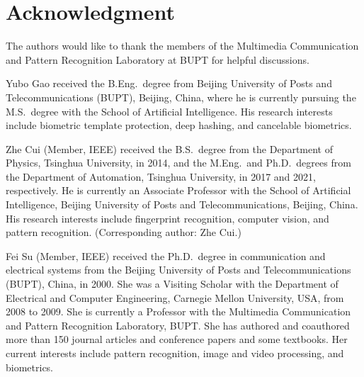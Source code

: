 \documentclass[journal]{IEEEtran}
\begin{document}
\section*{Acknowledgment}
The authors would like to thank the members of the Multimedia
Communication and Pattern Recognition Laboratory at BUPT for helpful
discussions.




\begin{IEEEbiographynophoto}{Yubo Gao}
received the B.Eng.\ degree from Beijing University of Posts and
Telecommunications (BUPT), Beijing, China, where he is currently
pursuing the M.S.\ degree with the School of Artificial Intelligence.
His research interests include biometric template protection,
deep hashing, and cancelable biometrics.
\end{IEEEbiographynophoto}

\begin{IEEEbiographynophoto}{Zhe Cui}
(Member, IEEE) received the B.S.\ degree from the Department of
Physics, Tsinghua University, in 2014, and the M.Eng.\ and Ph.D.\
degrees from the Department of Automation, Tsinghua University,
in 2017 and 2021, respectively.
He is currently an Associate Professor with the School of Artificial
Intelligence, Beijing University of Posts and Telecommunications,
Beijing, China.
His research interests include fingerprint recognition, computer
vision, and pattern recognition.
(Corresponding author: Zhe Cui.)
\end{IEEEbiographynophoto}

\begin{IEEEbiographynophoto}{Fei Su}
(Member, IEEE) received the Ph.D.\ degree in communication and
electrical systems from the Beijing University of Posts and
Telecommunications (BUPT), China, in 2000.
She was a Visiting Scholar with the Department of Electrical and
Computer Engineering, Carnegie Mellon University, USA, from 2008 to
2009.
She is currently a Professor with the Multimedia Communication and
Pattern Recognition Laboratory, BUPT.
She has authored and coauthored more than 150 journal articles and
conference papers and some textbooks.
Her current interests include pattern recognition, image and video
processing, and biometrics.
\end{IEEEbiographynophoto}
\end{document}

